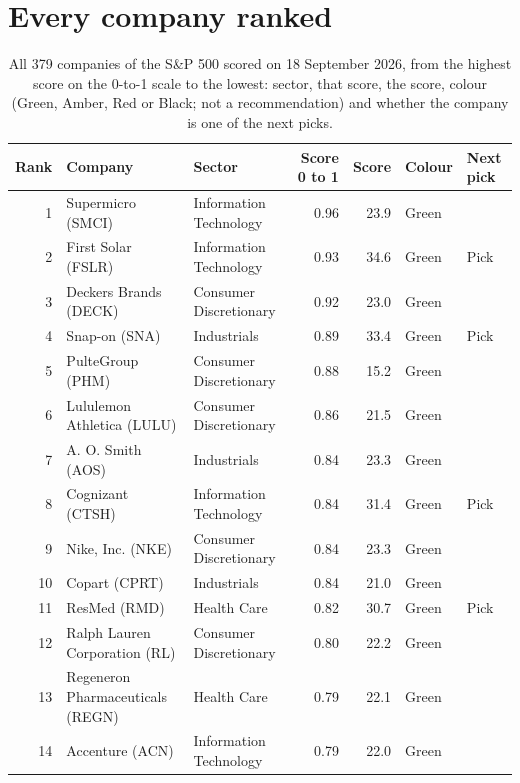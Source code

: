\documentclass[11pt,a4paper]{article}
\begin{document}
\section{Every company ranked}
\label{app:ranking}
{\small
\begin{longtable}{r p{4.4cm} p{2.8cm} r r l l}
\caption{All 379 companies of the S\&P 500 scored on 18 September 2026, from the highest score on the 0-to-1 scale to the lowest: sector, that score, the score, colour (Green, Amber, Red or Black; not a recommendation) and whether the company is one of the next picks.}\label{tab:ranking}\\
\hline
Rank & Company & Sector & Score 0 to 1 & Score & Colour & Next pick \\
\hline
\endhead
1 & Supermicro (SMCI) & Information Technology & 0.96 & 23.9 & \cellcolor[HTML]{C6EFCE}Green &  \\
2 & First Solar (FSLR) & Information Technology & 0.93 & 34.6 & \cellcolor[HTML]{C6EFCE}Green & Pick \\
3 & Deckers Brands (DECK) & Consumer Discretionary & 0.92 & 23.0 & \cellcolor[HTML]{C6EFCE}Green &  \\
4 & Snap-on (SNA) & Industrials & 0.89 & 33.4 & \cellcolor[HTML]{C6EFCE}Green & Pick \\
5 & PulteGroup (PHM) & Consumer Discretionary & 0.88 & 15.2 & \cellcolor[HTML]{C6EFCE}Green &  \\
6 & Lululemon Athletica (LULU) & Consumer Discretionary & 0.86 & 21.5 & \cellcolor[HTML]{C6EFCE}Green &  \\
7 & A. O. Smith (AOS) & Industrials & 0.84 & 23.3 & \cellcolor[HTML]{C6EFCE}Green &  \\
8 & Cognizant (CTSH) & Information Technology & 0.84 & 31.4 & \cellcolor[HTML]{C6EFCE}Green & Pick \\
9 & Nike, Inc. (NKE) & Consumer Discretionary & 0.84 & 23.3 & \cellcolor[HTML]{C6EFCE}Green &  \\
10 & Copart (CPRT) & Industrials & 0.84 & 21.0 & \cellcolor[HTML]{C6EFCE}Green &  \\
11 & ResMed (RMD) & Health Care & 0.82 & 30.7 & \cellcolor[HTML]{C6EFCE}Green & Pick \\
12 & Ralph Lauren Corporation (RL) & Consumer Discretionary & 0.80 & 22.2 & \cellcolor[HTML]{C6EFCE}Green &  \\
13 & Regeneron Pharmaceuticals (REGN) & Health Care & 0.79 & 22.1 & \cellcolor[HTML]{C6EFCE}Green &  \\
14 & Accenture (ACN) & Information Technology & 0.79 & 22.0 & \cellcolor[HTML]{C6EFCE}Green &  \\

\end{longtable}}
\end{document}
